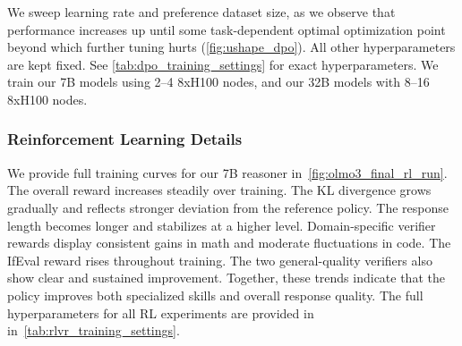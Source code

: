 \documentclass[table]{ai2style/ai2}
\newcommand{\newOlmo}{Olmo\xspace}
\newcommand{\olmothreeinstruct}{\textsc{\newOlmo~3 Instruct}\xspace}
\newcommand{\olmothreethinking}{\textsc{Olmo~3 Think}\xspace}
\begin{document}
{{We sweep learning rate and preference dataset size, as we observe that performance increases up until some task-dependent optimal optimization point beyond which further tuning hurts (\autoref{fig:ushape_dpo}). All other hyperparameters are kept fixed. See \autoref{tab:dpo_training_settings} for exact hyperparameters. We train our 7B models using 2–4 8xH100 nodes, and our 32B models with 8–16 8xH100 nodes.
\begin{table}[th]
    \centering
    \begin{small}
    \end{small}
    \caption{\textbf{Training hyperparameters for \olmothreethinking DPO and \olmothreeinstruct DPO}. GPU hours assume NVIDIA H100 accelerator.}
    \label{tab:dpo_training_settings}
\end{table}

\subsubsection{Reinforcement Learning Details}
We provide full training curves for our 7B reasoner in~\autoref{fig:olmo3_final_rl_run}.
The overall reward increases steadily over training. The KL divergence grows gradually and reflects stronger deviation from the reference policy. The response length becomes longer and stabilizes at a higher level. Domain-specific verifier rewards display consistent gains in math and moderate fluctuations in code. The IfEval reward rises throughout training. The two general-quality verifiers also show clear and sustained improvement. Together, these trends indicate that the policy improves both specialized skills and overall response quality. The full hyperparameters for all RL experiments are provided in in~\autoref{tab:rlvr_training_settings}.

}}
\end{document}
